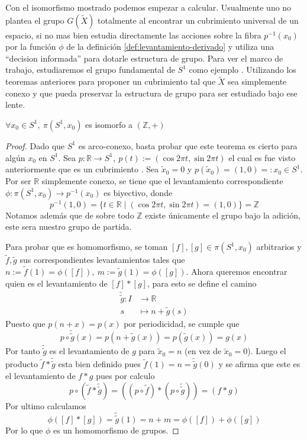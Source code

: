 Con el isomorfismo mostrado podemos empezar a calcular. Usualmente uno
no plantea el grupo \(G (\tilde X)\) totalmente al encontrar un
cubrimiento universal de un espacio, si no mas bien estudia directamente
las acciones sobre la fibra \(p^{-1} (x_0)\) por la función
\(\phi\) de la definición \ref{def:levantamiento-derivado} y utiliza una
``decision informada'' para dotarle estructura de grupo. Para ver el
marco de trabajo, estudiaremos el grupo fundamental de \(S^1\) como
ejemplo . Utilizando los teoremas anteriores para proponer un
cubrimiento tal que \(\tilde X\) sea simplemente conexo y que pueda
preservar la estructura de grupo para ser estudiado bajo ese lente.
\begin{teorema} \label{thm:grupo-S1}
  \(\forall x_0 \in S^1,\ \pi (S^1,x_0)\) es isomorfo a \((\mathbb Z, +)\)
\end{teorema}
\begin{proof}
  Dado que \(S^1\) es arco-conexo, basta probar que este teorema es
  cierto para algún \(x_0\) en \(S^1\). Sea \(p : \mathbb R \to S^1,\
  p(t) := (\cos 2 \pi t, \sin 2 \pi t)\) el cual es fue visto anteriormente
  que es un cubrimiento . Sea \(\tilde x _0 = 0\) y \( p(\tilde x _0) =
  (1,0) =: x_0 \in S^1\). Por ser \(\mathbb R\) simplemente conexo, se
  tiene que el levantamiento correspondiente \(\phi : \pi (S^1, x_0) \to
  p^{-1} (x_0)\) es biyectivo, donde
  \[ p^{-1} (1,0) = \{t \in \mathbb R \mid (\cos 2 \pi t, \sin 2 \pi t)
    = (1, 0) \} = \mathbb Z \]
  Notamos además que de sobre todo \(\mathbb Z\) existe únicamente el
  grupo bajo la adición, este sera nuestro grupo de partida.

  Para probar que es homomorfismo, se toman \([f], [g] \in \pi
  (S^1, x_0)\) arbitrarios y \(\tilde f, \tilde g\) sus correspondientes
  levantamientos tales que \(n := \tilde f (1) = \phi ([f]),\ m :=
  \tilde g (1) = \phi ([g])\). Ahora queremos encontrar quien es el
  levantamiento de \([f] * [g]\), para esto se define el camino
  \begin{align*}
    \tilde{\tilde g} : I &\longrightarrow \mathbb R \\
    s &\longmapsto n + \tilde g (s)
  \end{align*}
  Puesto que \(p(n + x) = p(x)\) por periodicidad, se cumple que
  \[ p \circ \tilde{\tilde g} (x) = p (n + \tilde g (x)) = p (\tilde g
    (x)) = g (x) \]
  Por tanto \(\tilde{\tilde g}\) es el levantamiento de \(g\) para
  \(\tilde x_0 = n\) (en vez de \(\tilde x_0 = 0\)). Luego el producto
  \(\tilde f * \tilde{\tilde g}\) esta bien definido pues \(\tilde f (1)
  = n = \tilde{\tilde g} (0)\) y se afirma que este es el levantamiento
  de \(f * g\) pues por calculo
  \[ p \circ (\tilde f * \tilde{\tilde g}) =
     ((p \circ \tilde f) * (p \circ \tilde{\tilde g})) =
     (f * g)
  \]
  Por ultimo calculamos
  \[ \phi ([f] * [g]) = \tilde{\tilde g} (1) = n + m = \phi ([f]) + \phi
  ([g]) \]
  Por lo que \(\phi\) es un homomorfismo de grupos.
\end{proof}

